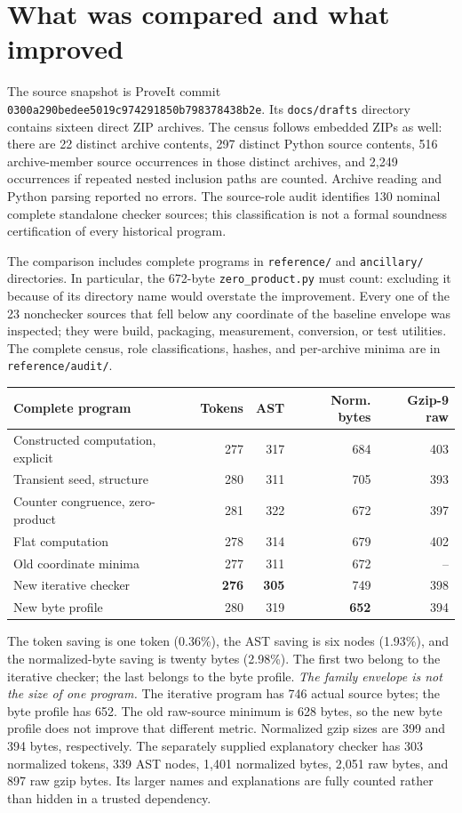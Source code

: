 \documentclass[11pt,letterpaper]{article}
\theoremstyle{definition}\newtheorem{definition}[theorem]{Definition}
\theoremstyle{remark}\newtheorem{remark}[theorem]{Remark}
\newcommand{\file}[1]{{\small\nolinkurl{#1}}}
\begin{document}
\section{What was compared and what improved}
\label{sec:results}

The source snapshot is ProveIt commit
\file{0300a290bedee5019c974291850b798378438b2e}. Its
\file{docs/drafts} directory contains sixteen direct ZIP archives.
The census follows embedded ZIPs as well: there are 22 distinct archive
contents, 297 distinct Python source contents, 516 archive-member source
occurrences in those distinct archives, and 2,249 occurrences if repeated
nested inclusion paths are counted. Archive reading and Python parsing
reported no errors. The source-role audit identifies 130 nominal complete
standalone checker sources; this classification is not a formal
soundness certification of every historical program.

The comparison includes complete programs in \file{reference/} and
\file{ancillary/} directories. In particular, the 672-byte
\file{zero_product.py} must count: excluding it because of its directory
name would overstate the improvement. Every one of the 23 nonchecker
sources that fell below any coordinate of the baseline envelope was inspected;
they were build, packaging, measurement, conversion, or test utilities.
The complete census, role classifications, hashes, and per-archive
minima are in \file{reference/audit/}.

\begin{center}\small
\begin{tabular}{lrrrr}
\toprule
Complete program & Tokens & AST & Norm. bytes & Gzip-9 raw\\
\midrule
Constructed computation, explicit &277&317&684&403\\
Transient seed, structure &280&311&705&393\\
Counter congruence, zero-product &281&322&672&397\\
Flat computation &278&314&679&402\\
\midrule
Old coordinate minima &277&311&672&--\\
New iterative checker &\textbf{276}&\textbf{305}&749&398\\
New byte profile &280&319&\textbf{652}&394\\
\bottomrule
\end{tabular}
\end{center}

The token saving is one token (0.36\%), the AST saving is six nodes
(1.93\%), and the normalized-byte saving is twenty bytes (2.98\%).
The first two belong to the iterative checker; the last belongs to
the byte profile. \emph{The family envelope is not the size of one program.}
The iterative program has 746 actual source bytes; the byte profile has
652. The old raw-source minimum is 628 bytes, so the new byte profile
does not improve that different metric. Normalized gzip sizes are
399 and 394 bytes, respectively. The separately supplied explanatory
checker has 303 normalized tokens, 339 AST nodes, 1,401 normalized bytes,
2,051 raw bytes, and 897 raw gzip bytes. Its larger names and explanations
are fully counted rather than hidden in a trusted dependency.
\end{document}
